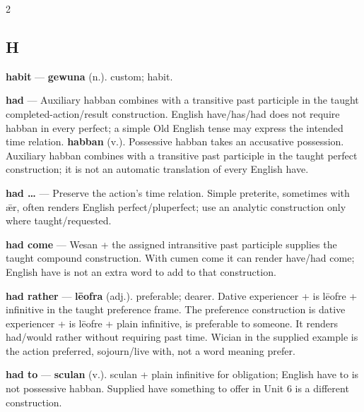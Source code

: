 \begin{multicols}{2}
\subsection*{H}
\textbf{habit} — \textbf{gewuna} (n.). custom; habit.\par
\textbf{had} — Auxiliary habban combines with a transitive past participle in the taught completed-action/result construction. English have/has/had does not require habban in every perfect; a simple Old English tense may express the intended time relation. \textbf{habban} (v.). Possessive habban takes an accusative possession. Auxiliary habban combines with a transitive past participle in the taught perfect construction; it is not an automatic translation of every English have.\par
\textbf{had …} — Preserve the action's time relation. Simple preterite, sometimes with ǣr, often renders English perfect/pluperfect; use an analytic construction only where taught/requested.\par
\textbf{had come} — Wesan + the assigned intransitive past participle supplies the taught compound construction. With cumen come it can render have/had come; English have is not an extra word to add to that construction.\par
\textbf{had rather} — \textbf{lēofra} (adj.). preferable; dearer. Dative experiencer + is lēofre + infinitive in the taught preference frame. The preference construction is dative experiencer + is lēofre + plain infinitive, is preferable to someone. It renders had/would rather without requiring past time. Wician in the supplied example is the action preferred, sojourn/live with, not a word meaning prefer.\par
\textbf{had to} — \textbf{sculan} (v.). sculan + plain infinitive for obligation; English have to is not possessive habban. Supplied have something to offer in Unit 6 is a different construction.\par

\end{multicols}
